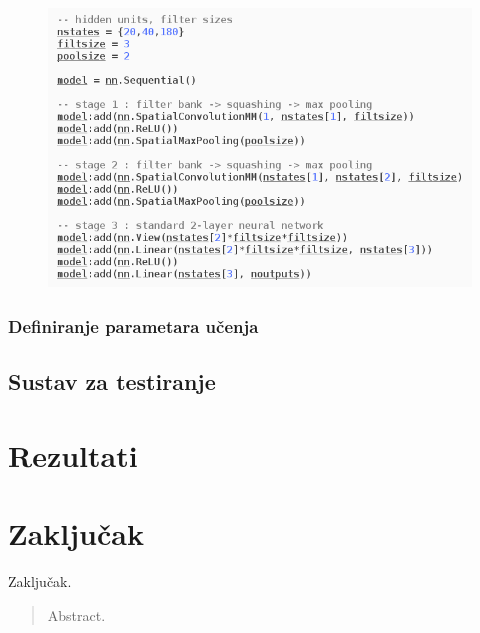 \documentclass[lmodern, utf8, diplomski, numeric]{fer}
\begin{document}
\begin{figure}[ht!]
\centering
\includegraphics[width=16cm]{slike/cnn_model.png}
\caption{}
\end{figure}

\subsection{Definiranje parametara učenja}



\section{Sustav za testiranje}

\chapter{Rezultati}

\chapter{Zaključak}
Zaključak.




\begin{sazetak}


\end{sazetak}

\begin{abstract}
Abstract.

\end{abstract}
\end{document}
